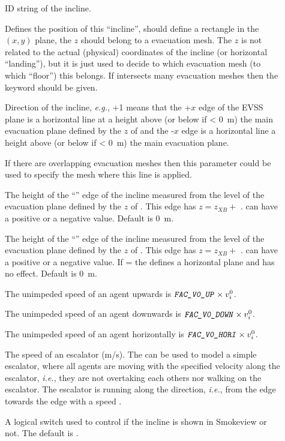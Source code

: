 \documentclass[12pt,a4paper,final,twoside]{stylevk}
\begin{document}
\begin{description}
%
%
\item[] ID string of the incline.
%
\item[] Defines the position of this ``incline'', should
  define a rectangle in the $(x,y)$ plane, the $z$ should belong to a
  evacuation mesh.  The $z$ is not related to the actual (physical)
  coordinates of the incline (or horizontal ``landing''), but it is
  just used to decide to which evacuation mesh (to which ``floor'')
  this  belongs.  If  intersects many evacuation
  meshes then the keyword  should be given.
%
\item[] Direction of the incline, \emph{e.g.}, +1 means
  that the +$x$ edge of the EVSS plane is a horizontal line at a
  height  above (or below if < 0~m) the main evacuation
  plane defined by the $z$ of  and the -$x$ edge is a
  horizontal line a height  above (or below if < 0~m)
  the main evacuation plane.
%
\item[] If there are overlapping evacuation meshes
  then this parameter could be used to specify the mesh where this
   line is applied.
%
\item[] The height of the ``'' edge of the
  incline measured from the level of the evacuation plane defined by
  the $z$ of .  This edge has $z = z_{\scriptscriptstyle XB}
  +$ .   can have a positive or a negative
  value.  Default is 0~m.
%
\item[] The height of the ``'' edge of the
  incline measured from the level of the evacuation plane defined by
  the $z$ of .  This edge has $z = z_{\scriptscriptstyle XB}
  +$ .   can have a positive or a
  negative value.  If = the 
  defines a horizontal plane and  has no effect.  Default
  is 0~m.
%
\item[] The unimpeded speed of an agent upwards is
  $\textnormal{\texttt{\textsl{FAC\_V0\_UP}}} \times v_i^0$.
%
\item[] The unimpeded speed of an agent downwards
  is $\textnormal{\texttt{\textsl{FAC\_V0\_DOWN}}} \times v_i^0$.
%
\item[] The unimpeded speed of an agent
  horizontally is $\textnormal{\texttt{\textsl{FAC\_V0\_HORI}}} \times
  v_i^0$.
%
\item[] The speed of an escalator (m/s).  The
   can be used to model a simple escalator, where all
  agents are moving with the specified velocity 
  along the escalator, \emph{i.e.}, they are not overtaking each
  others nor walking on the escalator.  The escalator is running along
  the  direction, \emph{i.e.}, from the 
  edge towards the  edge with a speed
  .
%
\item[] A logical switch used to control if the incline is
  shown in Smokeview or not.  The default is .
%
\end{description}
%
\end{document}
